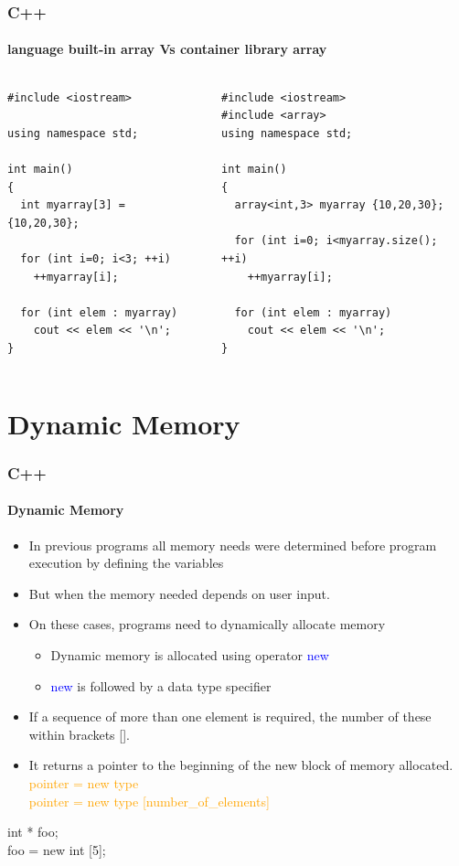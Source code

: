 \documentclass[hyperref={pdfpagelabels=true}]{beamer}
\begin{document}
\begin{frame}[fragile]
\frametitle{C++}
\framesubtitle{language built-in array Vs container library array}
\tiny
	\begin{columns}[t]
  		\begin{column}{5cm}
    			\begin{verbatim}
#include <iostream>

using namespace std;

int main()
{
  int myarray[3] = {10,20,30};

  for (int i=0; i<3; ++i)
    ++myarray[i];

  for (int elem : myarray)
    cout << elem << '\n';
}
	\end{verbatim}
  		\end{column}
  		\begin{column}{5cm}
\begin{verbatim}
#include <iostream>
#include <array>
using namespace std;

int main()
{
  array<int,3> myarray {10,20,30};

  for (int i=0; i<myarray.size(); ++i)
    ++myarray[i];

  for (int elem : myarray)
    cout << elem << '\n';
}
\end{verbatim}
  		\end{column}
	\end{columns}
\end{frame}


\section{Dynamic Memory}
\begin{frame}
\frametitle{C++}
\framesubtitle{Dynamic Memory}
\begin{itemize}[<+->]
\item In previous programs all memory needs were determined before program execution by defining the variables 
\item But when the memory needed depends on user input.
\item On these cases, programs need to dynamically allocate memory
\begin{itemize}
\item Dynamic memory is allocated using operator \textcolor{blue}{new}
\item  \textcolor{blue}{new} is followed by a data type specifier 
\end{itemize}
\item If a sequence of more than one element is required, the number of these within brackets []. 
\item It returns a pointer to the beginning of the new block of memory allocated.\\
\textcolor{orange}{pointer = new type \\
pointer = new type [number\_of\_elements]}
\end{itemize}
\textcolor{mygreen}{
int * foo;\\
foo = new int [5];}
\end{frame}
\end{document}
